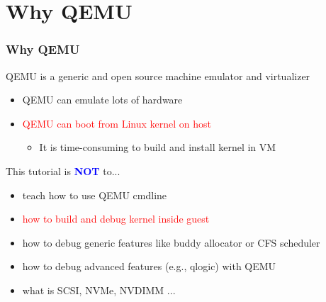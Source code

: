 \documentclass[aspectratio=169]{beamer}
\begin{document}

\section{Why QEMU}
\begin{frame}
\frametitle{Why QEMU}
\large
QEMU is a generic and open source machine emulator and virtualizer
\begin{itemize}
\item QEMU can emulate lots of hardware
\item \textcolor{red}{QEMU can boot from Linux kernel on host}
    \begin{itemize}
	\item It is time-consuming to build and install kernel in VM
    \end{itemize}
\end{itemize}

This tutorial is \textbf{\textcolor{blue}{NOT}} to...
\begin{itemize}
\item teach how to use QEMU cmdline
\item \textcolor{red}{how to build and debug kernel inside guest}
\item how to debug generic features like buddy allocator or CFS scheduler
\item how to debug advanced features (e.g., qlogic) with QEMU
\item what is SCSI, NVMe, NVDIMM ...
\end{itemize}			
\end{frame}

\end{document}
